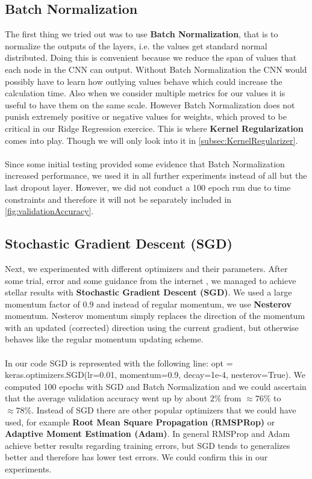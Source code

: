 \documentclass{article}
\begin{document}
	\subsection{Batch Normalization}
	\label{subsec:BatchNormalization}
	The first thing we tried out was to use \textbf{Batch Normalization}, that is to normalize the outputs of the layers, i.e. the values get standard normal distributed. Doing this is convenient because we reduce the span of values that each node in the CNN can output. Without Batch Normalization the CNN would possibly have to learn how outlying values behave which could increase the calculation time. Also when we consider multiple metrics for our values it is useful to have them on the same scale. However Batch Normalization does not punish extremely positive or negative values for weights, which proved to be critical in our Ridge Regression exercice. This is where \textbf{Kernel Regularization} comes into play. Though we will only look into it in \autoref{subsec:KernelRegularizer}. \\
	\\
	Since some initial testing provided some evidence that Batch Normalization increased performance, we used it in all further experiments instead of all but the last dropout layer. However, we did not conduct a 100 epoch run due to time constraints and therefore it will not be separately included in \autoref{fig:validationAccuracy}. 
	
	
	\subsection{Stochastic Gradient Descent (SGD)}
	\label{subsec:StochasticGradientDescent}
	Next, we experimented with different optimizers and their parameters. After some trial, error and some guidance from the internet \cite{Ruder2016SGD}, we managed to achieve stellar results with \textbf{Stochastic Gradient Descent (SGD)}. We used a large momentum factor of $0.9$ and instead of regular momentum, we use \textbf{Nesterov} momentum. Nesterov momentum simply replaces the direction of the momentum with an updated (corrected) direction using the current gradient, but otherwise behaves like the regular momentum updating scheme.\\
	\\
	In our code SGD is represented with the following line: opt = keras.optimizers.SGD(lr=0.01, momentum=0.9, decay=1e-4, nesterov=True). We computed 100 epochs with SGD and Batch Normalization and we could ascertain that the average validation accuracy went up by about $2\%$ from $\approx 76\%$ to $\approx 78\%$. Instead of SGD there are other popular optimizers that we could have used, for example \textbf{Root Mean Square Propagation (RMSPRop)} or \textbf{Adaptive Moment Estimation (Adam)}. In general RMSProp and Adam achieve better results regarding training errors, but SGD tends to generalizes better and therefore has lower test errors. We could confirm this in our experiments.
	
\end{document}
